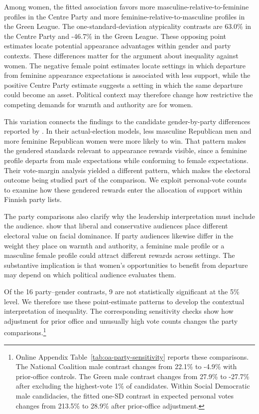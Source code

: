 \documentclass[11pt,a4paper]{article}\usepackage[]{graphicx}\usepackage[]{xcolor}
\begin{document}
Among women, the fitted association favors more masculine-relative-to-feminine profiles in the Centre Party and more feminine-relative-to-masculine profiles in the Green League. The one-standard-deviation atypicality contrasts are 63.0\% in the Centre Party and -46.7\% in the Green League. These opposing point estimates locate potential appearance advantages within gender and party contexts. These differences matter for the argument about inequality against women. The negative female point estimates locate settings in which departure from feminine appearance expectations is associated with less support, while the positive Centre Party estimate suggests a setting in which the same departure could become an asset. Political context may therefore change how restrictive the competing demands for warmth and authority are for women.

This variation connects the findings to the candidate gender-by-party differences reported by \textcite{Carpinella2016}. In their actual-election models, less masculine Republican men and more feminine Republican women were more likely to win. That pattern makes the gendered standards relevant to appearance rewards visible, since a feminine profile departs from male expectations while conforming to female expectations. Their vote-margin analysis yielded a different pattern, which makes the electoral outcome being studied part of the comparison. We exploit personal-vote counts to examine how these gendered rewards enter the allocation of support within Finnish party lists.

The party comparisons also clarify why the leadership interpretation must include the audience. \textcite{LaustsenPetersen2016} show that liberal and conservative audiences place different electoral value on facial dominance. If party audiences likewise differ in the weight they place on warmth and authority, a feminine male profile or a masculine female profile could attract different rewards across settings. The substantive implication is that women's opportunities to benefit from departure may depend on which political audience evaluates them.

Of the 16 party--gender contrasts, 9 are not statistically significant at the 5\% level. We therefore use these point-estimate patterns to develop the contextual interpretation of inequality. The corresponding sensitivity checks show how adjustment for prior office and unusually high vote counts changes the party comparisons.\footnote{Online Appendix Table~\ref{tab:oa-party-sensitivity} reports these comparisons. The National Coalition male contrast changes from 22.1\% to -4.9\% with prior-office controls. The Green male contrast changes from 27.9\% to -27.7\% after excluding the highest-vote 1\% of candidates. Within Social Democratic male candidacies, the fitted one-SD contrast in expected personal votes changes from 213.5\% to 28.9\% after prior-office adjustment.}
\end{document}
